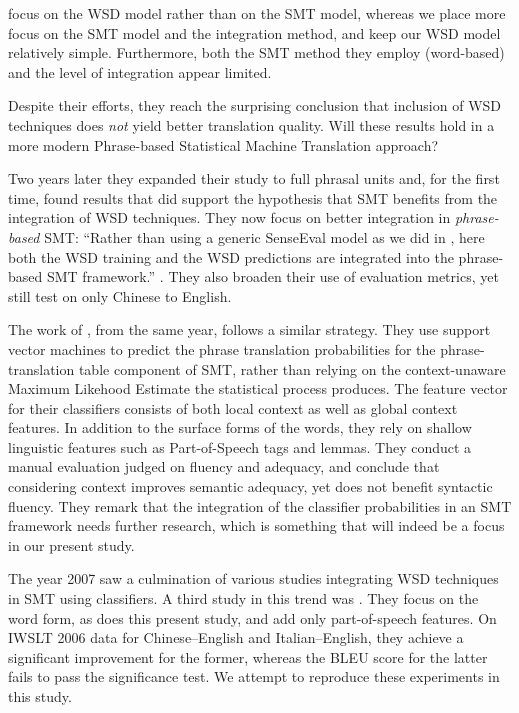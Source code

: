 \documentclass[smallextended]{svjour3}       %
\theoremstyle{break}
\begin{document}
\cite{CarpuatWu05} focus on the WSD model rather than on the SMT
model, whereas we place more focus on the SMT model and the
integration method, and keep our WSD model relatively
simple. Furthermore, both the SMT method they employ (word-based) and
the level of integration appear limited.

Despite their efforts, they reach the surprising conclusion that inclusion of
WSD techniques does \emph{not} yield better translation quality. Will these
results hold in a more modern Phrase-based Statistical Machine Translation
approach?

Two years later they expanded their study to full phrasal units
\citep{CarpuatWu07} and, for the first time, found results that did support the
hypothesis that SMT benefits from the integration of WSD techniques. They now
focus on better integration in \emph{phrase-based} SMT: ``Rather than using a
generic SenseEval model as we did in \cite{CarpuatWu05}, here both the WSD
training and the WSD predictions are integrated into the phrase-based SMT
framework.'' \citep{CarpuatWu07}. They also broaden their use of evaluation
metrics, yet still test on only Chinese to English.

The work of \cite{Gimenez+07}, from the same year, follows a similar
strategy. They use support vector machines to predict the phrase
translation probabilities for the phrase-translation table component
of SMT, rather than relying on the context-unaware Maximum Likehood
Estimate the statistical process produces. The feature vector for
their classifiers consists of both local context as well as global
context features.  In addition to the surface forms of the words, they
rely on shallow linguistic features such as Part-of-Speech tags and
lemmas. They conduct a manual evaluation judged on fluency and
adequacy, and conclude that considering context improves semantic
adequacy, yet does not benefit syntactic fluency. They remark that the
integration of the classifier probabilities in an SMT framework needs
further research, which is something that will indeed be a focus in
our present study.

The year 2007 saw a culmination of various studies integrating WSD techniques in
SMT using classifiers. A third study in this trend was \cite{Stroppa+07}. They
focus on the word form, as does this present study, and add only
part-of-speech features. On IWSLT 2006 data for Chinese--English and
Italian--English, they achieve a significant improvement for the former, whereas
the BLEU score for the latter fails to pass the significance test. We 
attempt to reproduce these experiments in this study.
\end{document}
